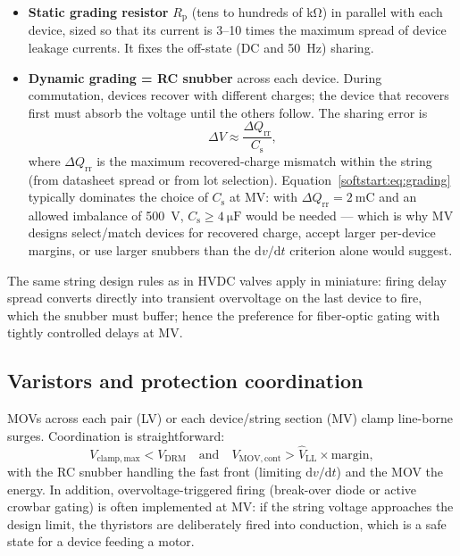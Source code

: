 \begin{itemize}
  \item \textbf{Static grading resistor} $R_\mathrm{p}$ (tens to hundreds of
        \si{\kilo\ohm}) in parallel with each device, sized so that its
        current is 3--10 times the maximum spread of device leakage
        currents. It fixes the off-state (DC and \SI{50}{\hertz}) sharing.
  \item \textbf{Dynamic grading = RC snubber} across each device. During
        commutation, devices recover with different charges; the device that
        recovers first must absorb the voltage until the others follow. The
        sharing error is
        \begin{equation}
          \Delta V \approx \frac{\Delta Q_\mathrm{rr}}{C_\mathrm{s}},
          \label{softstart:eq:grading}
        \end{equation}
        where $\Delta Q_\mathrm{rr}$ is the maximum recovered-charge
        mismatch within the string (from datasheet spread or from lot
        selection). Equation~\eqref{softstart:eq:grading} typically dominates the
        choice of $C_\mathrm{s}$ at MV: with
        $\Delta Q_\mathrm{rr} = \SI{2}{\milli\coulomb}$ and an allowed
        imbalance of \SI{500}{\volt}, $C_\mathrm{s} \geq
        \SI{4}{\micro\farad}$ would be needed --- which is why MV designs
        select/match devices for recovered charge, accept larger per-device
        margins, or use larger snubbers than the $\mathrm{d}v/\mathrm{d}t$
        criterion alone would suggest.
\end{itemize}

The same string design rules as in HVDC valves apply in miniature: firing
delay spread converts directly into transient overvoltage on the last
device to fire, which the snubber must buffer; hence the preference for
fiber-optic gating with tightly controlled delays at MV.

\subsection{Varistors and protection coordination}

MOVs across each pair (LV) or each device/string section (MV) clamp
line-borne surges. Coordination is straightforward:
\begin{equation}
  V_\mathrm{clamp,max} < V_\mathrm{DRM}
  \quad\text{and}\quad
  V_\mathrm{MOV,cont} > \hat{V}_\mathrm{LL}\times\text{margin},
\end{equation}
with the RC snubber handling the fast front (limiting
$\mathrm{d}v/\mathrm{d}t$) and the MOV the energy. In addition,
overvoltage-triggered firing (break-over diode or active crowbar gating) is
often implemented at MV: if the string voltage approaches the design limit,
the thyristors are deliberately fired into conduction, which is a safe state
for a device feeding a motor.


